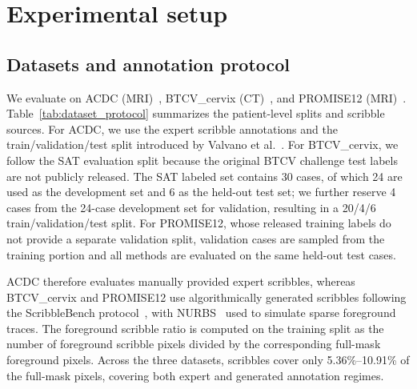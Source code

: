 \documentclass[preprint,12pt]{elsarticle}
\begin{document}
\section{Experimental setup}
\label{sec:experiments}

\subsection{Datasets and annotation protocol}

We evaluate on ACDC (MRI)~\cite{bernard2018acdc}, BTCV\_cervix (CT)~\cite{landman2015btcv}, and PROMISE12 (MRI)~\cite{litjens2014promise}. Table~\ref{tab:dataset_protocol} summarizes the patient-level splits and scribble sources. For ACDC, we use the expert scribble annotations and the train/validation/test split introduced by Valvano et al.~\cite{valvano2021scribbles}. For BTCV\_cervix, we follow the SAT evaluation split because the original BTCV challenge test labels are not publicly released. The SAT labeled set contains 30 cases, of which 24 are used as the development set and 6 as the held-out test set; we further reserve 4 cases from the 24-case development set for validation, resulting in a 20/4/6 train/validation/test split. For PROMISE12, whose released training labels do not provide a separate validation split, validation cases are sampled from the training portion and all methods are evaluated on the same held-out test cases.

ACDC therefore evaluates manually provided expert scribbles, whereas BTCV\_cervix and PROMISE12 use algorithmically generated scribbles following the ScribbleBench protocol~\cite{gotkowski2025scribblebench}, with NURBS~\cite{piegl2012nurbs} used to simulate sparse foreground traces. The foreground scribble ratio is computed on the training split as the number of foreground scribble pixels divided by the corresponding full-mask foreground pixels. Across the three datasets, scribbles cover only 5.36\%--10.91\% of the full-mask pixels, covering both expert and generated annotation regimes.

\begin{table}[!htbp]
\centering
\caption{Dataset protocol and scribble annotation statistics. Cases and images are reported as train/validation/test. Foreground scribble ratios are computed on the training split against the corresponding dense target masks.}
\label{tab:dataset_protocol}
\setlength{\tabcolsep}{3pt}
\end{table}
\end{document}
